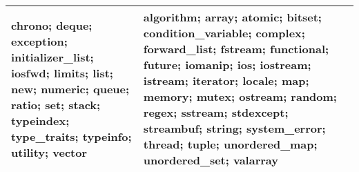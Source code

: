 \documentclass[10pt,a4paper]{article}
\begin{document}
\begin{center}
\begin{tabular}{ | p{3cm} | p{3cm} | p{3cm} |}
chrono; \newline
deque; \newline
exception; \newline
initializer\_list; \newline
iosfwd; \newline
limits; \newline
list; \newline
new; \newline
numeric; \newline
queue; \newline
ratio; \newline
set; \newline
stack; \newline
typeindex; \newline
type\_traits; \newline
typeinfo; \newline
utility; \newline
vector & 

algorithm; \newline
array; \newline
atomic; \newline
bitset; \newline
condition\_variable; \newline
complex; \newline
forward\_list; \newline
fstream; \newline
functional; \newline
future; \newline
iomanip; \newline
ios; \newline
iostream; \newline
istream; \newline
iterator; \newline
locale; \newline
map; \newline
memory; \newline
mutex; \newline
ostream; \newline
random; \newline
regex; \newline
sstream; \newline
stdexcept; \newline
streambuf; \newline
string; \newline
system\_error; \newline
thread; \newline
tuple; \newline
unordered\_map; \newline
unordered\_set; \newline
valarray \\
    \hline
  \end{tabular}
\end{center}
\end{document}
